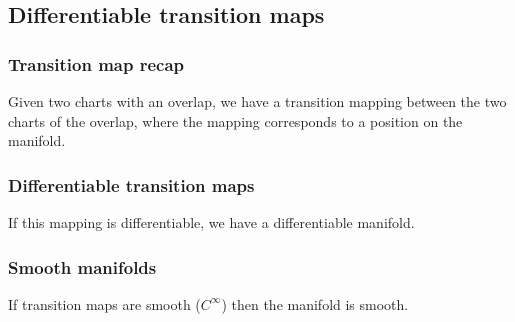 
\subsection{Differentiable transition maps}

\subsubsection{Transition map recap}

Given two charts with an overlap, we have a transition mapping between the two charts of the overlap, where the mapping corresponds to a position on the manifold.

\subsubsection{Differentiable transition maps}

If this mapping is differentiable, we have a differentiable manifold.

\subsubsection{Smooth manifolds}

If transition maps are smooth (\(C^\infty \)) then the manifold is smooth.

